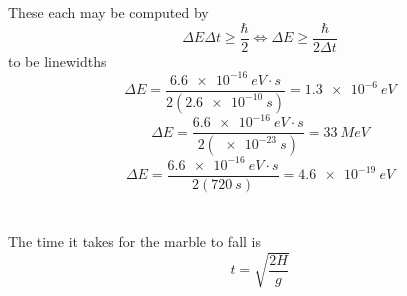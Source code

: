 \documentclass{article}
\begin{document}
\section{}
These each may be computed by
\[\Delta E\Delta t\geq \frac{\hbar}{2}\Leftrightarrow \Delta E\geq\frac{\hbar}{2\Delta t}\]
to be linewidths
\[\Delta E=\frac{\SI{6.6e-16}{eV\cdot s}}{2(\SI{2.6e-10}{s})}=\SI{1.3e-6}{eV}\]
\[\Delta E=\frac{\SI{6.6e-16}{eV\cdot s}}{2(\SI{e-23}{s})}=\SI{33}{MeV}\]
\[\Delta E=\frac{\SI{6.6e-16}{eV\cdot s}}{2(\SI{720}{s})}=\SI{4.6e-19}{eV}\]

\section{}
The time it takes for the marble to fall is
\[t=\sqrt{\frac{2H}{g}}\]
\end{document}
